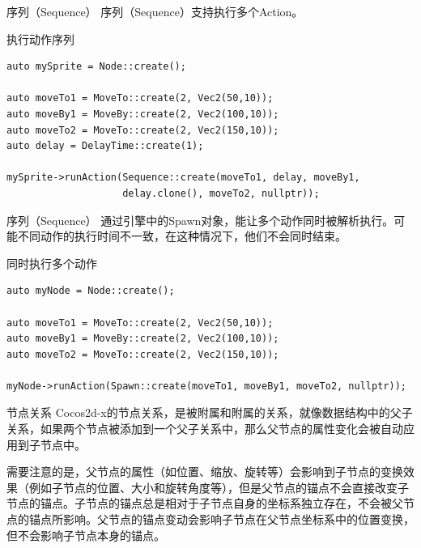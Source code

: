 \documentclass{beamer}
\begin{document}
\begin{frame}[fragile]{序列（Sequence）}
序列（Sequence）支持执行多个Action。
\begin{block}{执行动作序列}
\begin{verbatim}
auto mySprite = Node::create();

auto moveTo1 = MoveTo::create(2, Vec2(50,10));
auto moveBy1 = MoveBy::create(2, Vec2(100,10));
auto moveTo2 = MoveTo::create(2, Vec2(150,10));
auto delay = DelayTime::create(1);

mySprite->runAction(Sequence::create(moveTo1, delay, moveBy1,
                    delay.clone(), moveTo2, nullptr));
\end{verbatim}
\end{block}
\end{frame}


\begin{frame}[fragile]{序列（Sequence）}
通过引擎中的Spawn对象，能让多个动作同时被解析执行。可能不同动作的执行时间不一致，在这种情况下，他们不会同时结束。
\begin{block}{同时执行多个动作}
\begin{verbatim}
auto myNode = Node::create();

auto moveTo1 = MoveTo::create(2, Vec2(50,10));
auto moveBy1 = MoveBy::create(2, Vec2(100,10));
auto moveTo2 = MoveTo::create(2, Vec2(150,10));

myNode->runAction(Spawn::create(moveTo1, moveBy1, moveTo2, nullptr));
\end{verbatim}
\end{block}
\end{frame}


\begin{frame}[fragile]{节点关系}
Cocos2d-x的节点关系，是被附属和附属的关系，就像数据结构中的父子关系，如果两个节点被添加到一个父子关系中，那么父节点的属性变化会被自动应用到子节点中。

\vspace{1em}

需要注意的是，父节点的属性（如位置、缩放、旋转等）会影响到子节点的变换效果（例如子节点的位置、大小和旋转角度等），但是父节点的锚点不会直接改变子节点的锚点。子节点的锚点总是相对于子节点自身的坐标系独立存在，不会被父节点的锚点所影响。父节点的锚点变动会影响子节点在父节点坐标系中的位置变换，但不会影响子节点本身的锚点。
\end{frame}

\end{document}
